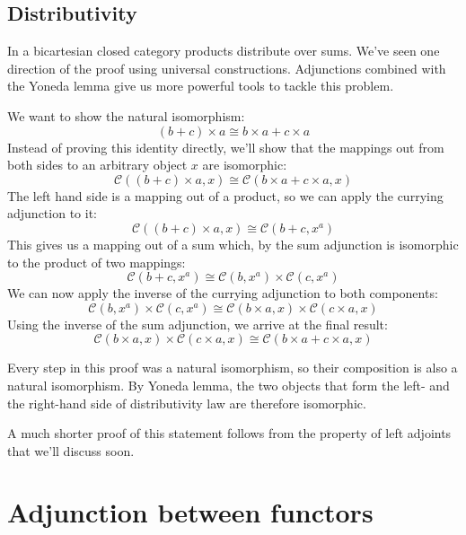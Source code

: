 \documentclass[DaoFP]{subfiles}
\begin{document}
\subsection{Distributivity}

In a bicartesian closed category products distribute over sums. We've seen one direction of the proof using universal constructions. Adjunctions combined with the Yoneda lemma give us more powerful tools to tackle this problem.

We want to show the natural isomorphism:
\[(b + c) \times a \cong b \times a + c \times a \]
Instead of proving this identity directly, we'll show that the mappings out from both sides to an arbitrary object $x$ are isomorphic:
\[  \mathcal{C} ((b + c) \times a, x) \cong \mathcal{C}(b \times a + c \times a, x) \]
The left hand side is a mapping out of a product, so we can apply the currying adjunction to it:
\[  \mathcal{C} ((b + c) \times a, x) \cong \mathcal{C}(b + c, x^a) \]
This gives us a mapping out of a sum which, by the sum adjunction is isomorphic to the product of two mappings:
\[  \mathcal{C}(b + c, x^a) \cong \mathcal{C}(b, x^a) \times \mathcal{C}(c, x^a)\]
We can now apply the inverse of the currying adjunction to both components:
\[  \mathcal{C}(b, x^a) \times \mathcal{C}(c, x^a) \cong \mathcal{C}(b \times a, x) \times \mathcal{C}(c \times a, x)\]
Using the inverse of the sum adjunction, we arrive at the final result:
\[ \mathcal{C}(b \times a, x) \times \mathcal{C}(c \times a, x) \cong \mathcal{C}(b \times a + c \times a, x) \]

Every step in this proof was a natural isomorphism, so their composition is also a natural isomorphism. By Yoneda lemma, the two objects that form the left- and the right-hand side of distributivity law are therefore isomorphic.

A much shorter proof of this statement follows from the property of left adjoints that we'll discuss soon.

\section{Adjunction between functors}
\end{document}
